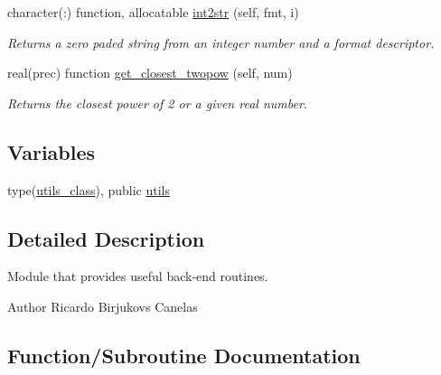 \begin{DoxyCompactItemize}
character(\+:) function, allocatable \mbox{\hyperlink{namespaceutilities__mod_a6ba00b0a503f26c7e755d1efbbe83c5b}{int2str}} (self, fmt, i)
\begin{DoxyCompactList}\small\item\em Returns a zero paded string from an integer number and a format descriptor. \end{DoxyCompactList}\item 
real(prec) function \mbox{\hyperlink{namespaceutilities__mod_a164054d89c012d95f63c12a6cc0ac8d7}{get\+\_\+closest\+\_\+twopow}} (self, num)
\begin{DoxyCompactList}\small\item\em Returns the closest power of 2 or a given real number. \end{DoxyCompactList}\end{DoxyCompactItemize}
\subsection*{Variables}
\begin{DoxyCompactItemize}
\item 
type(\mbox{\hyperlink{structutilities__mod_1_1utils__class}{utils\+\_\+class}}), public \mbox{\hyperlink{namespaceutilities__mod_aa12c2506b3107528a2511d059186f12d}{utils}}
\end{DoxyCompactItemize}


\subsection{Detailed Description}
Module that provides useful back-\/end routines. 

\begin{DoxyAuthor}{Author}
Ricardo Birjukovs Canelas 
\end{DoxyAuthor}


\subsection{Function/\+Subroutine Documentation}
\mbox{\label{namespaceutilities__mod_ad446cce78a6509db0e839439a0e84564}} 
